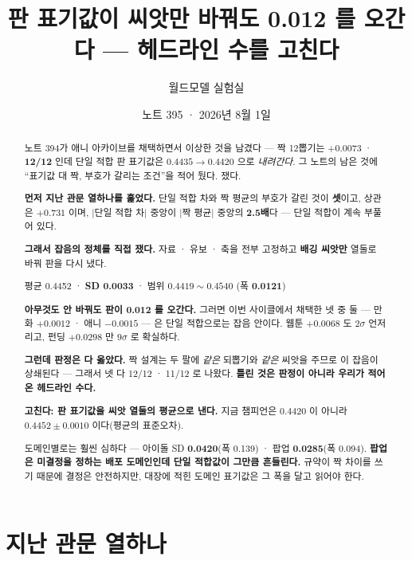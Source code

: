 \documentclass[11pt]{article}
\begin{document}
\title{판 표기값이 씨앗만 바꿔도 0.012 를 오간다 --- 헤드라인 수를 고친다}
\author{월드모델 실험실}
\date{노트 395 · 2026년 8월 1일}
\maketitle

\begin{abstract}
노트 394가 애니 아카이브를 채택하면서 이상한 것을 남겼다 --- 짝 12뽑기는
$+0.0073$ · \textbf{12/12} 인데 단일 적합 판 표기값은 $0.4435 \to 0.4420$
으로 \emph{내려간다}. 그 노트의 남은 것에 ``표기값 대 짝, 부호가 갈리는
조건''을 적어 뒀다. 쟀다.

\textbf{먼저 지난 관문 열하나를 훑었다.} 단일 적합 차와 짝 평균의 부호가
갈린 것이 \textbf{셋}이고, 상관은 $+0.731$ 이며, $|$단일 적합 차$|$ 중앙이
$|$짝 평균$|$ 중앙의 \textbf{2.5배}다 --- 단일 적합이 계속 부풀어 있다.

\textbf{그래서 잡음의 정체를 직접 쟀다.} 자료 · 유보 · 축을 전부 고정하고
\textbf{배깅 씨앗만} 열둘로 바꿔 판을 다시 냈다.

\begin{center}
평균 0.4452 · \textbf{SD 0.0033} · 범위 $0.4419 \sim 0.4540$ (폭 \textbf{0.0121})
\end{center}

\textbf{아무것도 안 바꿔도 판이 0.012 를 오간다.} 그러면 이번 사이클에서
채택한 넷 중 둘 --- 만화 $+0.0012$ · 애니 $-0.0015$ --- 은 단일 적합으로는
잡음 안이다. 웹툰 $+0.0068$ 도 $2\sigma$ 언저리고, 펀딩 $+0.0298$ 만
$9\sigma$ 로 확실하다.

\textbf{그런데 판정은 다 옳았다.} 짝 설계는 두 팔에 \emph{같은} 되뽑기와
\emph{같은} 씨앗을 주므로 이 잡음이 상쇄된다 --- 그래서 넷 다 12/12 ·
11/12 로 나왔다. \textbf{틀린 것은 판정이 아니라 우리가 적어 온 헤드라인
수다.}

\textbf{고친다: 판 표기값을 씨앗 열둘의 평균으로 낸다.} 지금 챔피언은
$0.4420$ 이 아니라 $\mathbf{0.4452 \pm 0.0010}$ 이다(평균의 표준오차).

도메인별로는 훨씬 심하다 --- 아이돌 SD \textbf{0.0420}(폭 0.139) · 팝업
\textbf{0.0285}(폭 0.094). \textbf{팝업은 미결정을 정하는 배포 도메인인데
단일 적합값이 그만큼 흔들린다.} 규약이 짝 차이를 쓰기 때문에 결정은
안전하지만, 대장에 적힌 도메인 표기값은 그 폭을 달고 읽어야 한다.
\end{abstract}

\section{지난 관문 열하나}
\end{document}
